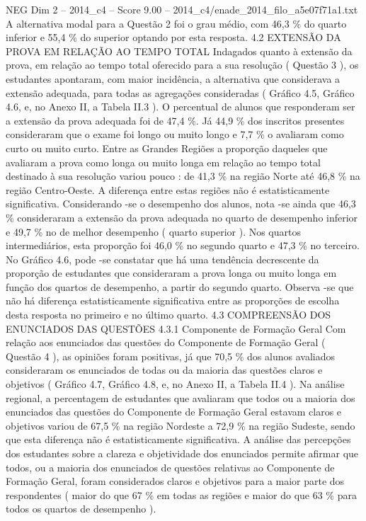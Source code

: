 \begin{textsample}{NEG Dim 2 – 2014\_c4 – Score 9.00 – 2014\_c4/enade\_2014\_filo\_a5e07f71a1.txt}
A alternativa modal para a Questão 2 foi o grau médio, com 46,3 \% do quarto inferior e 55,4 \% do superior optando por esta resposta. 4.2 EXTENSÃO DA PROVA EM RELAÇÃO AO TEMPO TOTAL Indagados quanto à extensão da prova, em relação ao tempo total oferecido para a sua resolução ( Questão 3 ), os estudantes apontaram, com maior incidência, a alternativa que considerava a extensão adequada, para todas as agregações consideradas ( Gráfico 4.5, Gráfico 4.6, e, no Anexo II, a Tabela II.3 ).
O percentual de alunos que responderam ser a extensão da prova adequada foi de 47,4 \%.
Já 44,9 \% dos inscritos presentes consideraram que o exame foi longo ou muito longo e 7,7 \% o avaliaram como curto ou muito curto.
Entre as Grandes Regiões a proporção daqueles que avaliaram a prova como longa ou muito longa em relação ao tempo total destinado à sua resolução variou pouco : de 41,3 \% na região Norte até 46,8 \% na região Centro-Oeste.
A diferença entre estas regiões não é estatisticamente significativa.
Considerando -se o desempenho dos alunos, nota -se ainda que 46,3 \% consideraram a extensão da prova adequada no quarto de desempenho inferior e 49,7 \% no de melhor desempenho ( quarto superior ).
Nos quartos intermediários, esta proporção foi 46,0 \% no segundo quarto e 47,3 \% no terceiro.
No Gráfico 4.6, pode -se constatar que há uma tendência decrescente da proporção de estudantes que consideraram a prova longa ou muito longa em função dos quartos de desempenho, a partir do segundo quarto.
Observa -se que não há diferença estatisticamente significativa entre as proporções de escolha desta resposta no primeiro e no último quarto. 4.3 COMPREENSÃO DOS ENUNCIADOS DAS QUESTÕES 4.3.1 Componente de Formação Geral Com relação aos enunciados das questões do Componente de Formação Geral ( Questão 4 ), as opiniões foram positivas, já que 70,5 \% dos alunos avaliados consideraram os enunciados de todas ou da maioria das questões claros e objetivos ( Gráfico 4.7, Gráfico 4.8, e, no Anexo II, a Tabela II.4 ).
Na análise regional, a percentagem de estudantes que avaliaram que todos ou a maioria dos enunciados das questões do Componente de Formação Geral estavam claros e objetivos variou de 67,5 \% na região Nordeste a 72,9 \% na região Sudeste, sendo que esta diferença não é estatisticamente significativa.
A análise das percepções dos estudantes sobre a clareza e objetividade dos enunciados permite afirmar que todos, ou a maioria dos enunciados de questões relativas ao Componente de Formação Geral, foram considerados claros e objetivos para a maior parte dos respondentes ( maior do que 67 \% em todas as regiões e maior do que 63 \% para todos os quartos de desempenho ).

\end{textsample}
